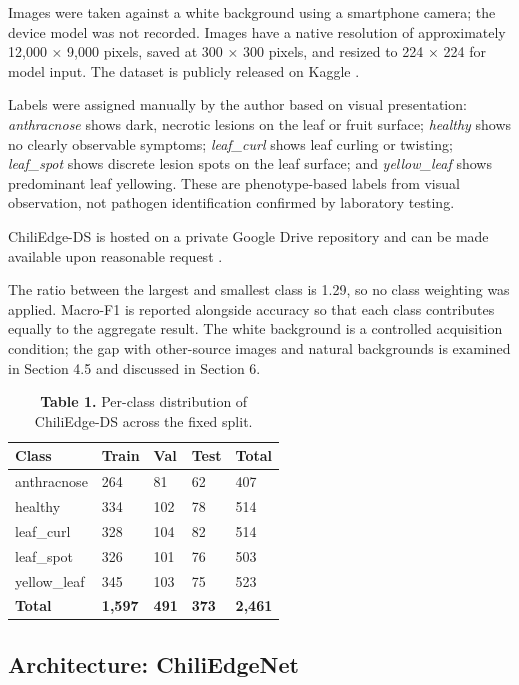 Images were taken against a white background using a smartphone camera; the device model was not recorded. Images have a native resolution of approximately 12,000 × 9,000 pixels, saved at 300 × 300 pixels, and resized to 224 × 224 for model input. The dataset is publicly released on Kaggle \cite{to2026c}.

Labels were assigned manually by the author based on visual presentation: \emph{anthracnose} shows dark, necrotic lesions on the leaf or fruit surface; \emph{healthy} shows no clearly observable symptoms; \emph{leaf\_curl} shows leaf curling or twisting; \emph{leaf\_spot} shows discrete lesion spots on the leaf surface; and \emph{yellow\_leaf} shows predominant leaf yellowing. These are phenotype-based labels from visual observation, not pathogen identification confirmed by laboratory testing.

ChiliEdge-DS is hosted on a private Google Drive repository and can be made available upon reasonable request \cite{to2026c}.

The ratio between the largest and smallest class is 1.29, so no class weighting was applied. Macro-F1 is reported alongside accuracy so that each class contributes equally to the aggregate result. The white background is a controlled acquisition condition; the gap with other-source images and natural backgrounds is examined in Section 4.5 and discussed in Section 6.

\begin{table}[H]
\centering
\caption*{\textbf{Table 1.} Per-class distribution of ChiliEdge-DS across the fixed split.}
\label{tab:1}
\footnotesize
\renewcommand{\arraystretch}{1.15}
\begin{tabular}{lllll}
\toprule
\textbf{Class} & \textbf{Train} & \textbf{Val} & \textbf{Test} & \textbf{Total} \\
\midrule
anthracnose & 264 & 81 & 62 & 407 \\
healthy & 334 & 102 & 78 & 514 \\
leaf\_curl & 328 & 104 & 82 & 514 \\
leaf\_spot & 326 & 101 & 76 & 503 \\
yellow\_leaf & 345 & 103 & 75 & 523 \\
\textbf{Total} & \textbf{1,597} & \textbf{491} & \textbf{373} & \textbf{2,461} \\
\bottomrule
\end{tabular}
\end{table}

\subsection{Architecture: ChiliEdgeNet}\label{architecture-chiliedgenet}


